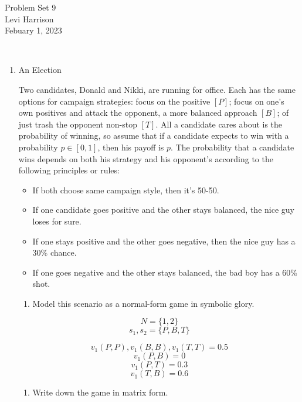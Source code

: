 \documentclass{article}
\begin{document}
\begin{center}
    \LARGE{Problem Set 9}\\[0.5em]
    \large{Levi Harrison}\\[0.5em]
    \small{Febuary 1, 2023}
\end{center}

\,

\begin{enumerate}
    \item An Election

          Two candidates, Donald and Nikki, are running for office. Each has the same options for campaign strategies: focus on the positive $[P]$; focus on one's own positives and attack the opponent, a more balanced approach $[B]$; of just trash the opponent non-stop $[T]$. All a candidate cares about is the probability of winning, so assume that if a candidate expects to win with a probability $p \in [0, 1]$, then his payoff is $p$. The probability that a candidate wins depends on both his strategy and his opponent's according to the following principles or rules:

          \begin{itemize}
              \item If both choose same campaign style, then it's 50-50.
              \item If one candidate goes positive and the other stays balanced, the nice guy loses for sure.
              \item If one stays positive and the other goes negative, then the nice guy has a 30\% chance.
              \item If one goes negative and the other stays balanced, the bad boy has a 60\% shot.
          \end{itemize}

          \begin{enumerate}[label=(\alph*)]
              \item Model this scenario as a normal-form game in symbolic glory.
          \end{enumerate}

          \[N = \{1, 2\}\]
          \[s_1, s_2 = \{P, B, T\}\]

          \[v_1(P, P), v_1(B, B), v_1(T, T) = 0.5\]
          \[v_1(P, B) = 0\]
          \[v_1(P, T) = 0.3\]
          \[v_1(T, B) = 0.6\]

          \begin{enumerate}[resume]
              \item Write down the game in matrix form.
          \end{enumerate}


\end{enumerate}
\end{document}
